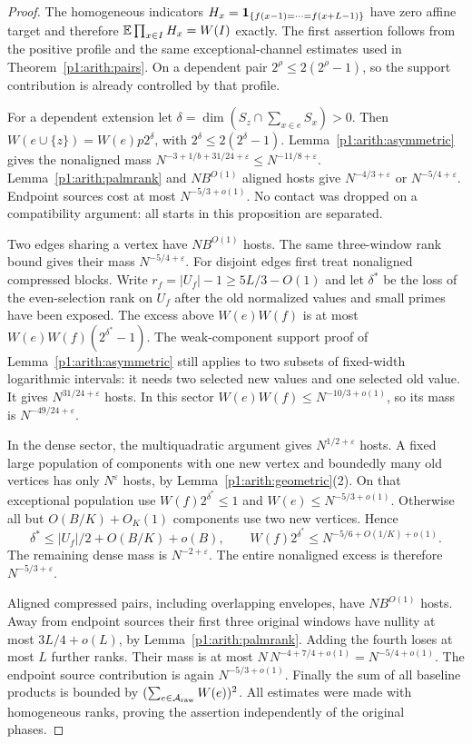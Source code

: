 \begin{proof}
The homogeneous indicators
$H_x=\mathbf 1_{\{f(x-1)=\cdots=f(x+L-1)\}}$ have zero affine target and
therefore $\mathbb E\prod_{x\in I}H_x=W(I)$ exactly.
The first assertion follows from the positive profile and the same
exceptional-channel estimates used in Theorem~\ref{p1:arith:pairs}.
On a dependent pair $2^\rho\leq2(2^\rho-1)$, so the support contribution
is already controlled by that profile.

For a dependent extension let $\delta=\dim(S_z\cap\sum_{x\in e}S_x)>0$.
Then $W(e\cup\{z\})=W(e)p2^\delta$, with
$2^\delta\leq2(2^\delta-1)$.  Lemma~\ref{p1:arith:asymmetric} gives
the nonaligned mass
$N^{-3+1/b+31/24+\varepsilon}\leq N^{-11/8+\varepsilon}$.
Lemma~\ref{p1:arith:palmrank} and $NB^{O(1)}$ aligned hosts give
$N^{-4/3+\varepsilon}$ or $N^{-5/4+\varepsilon}$.
Endpoint sources cost at most $N^{-5/3+o(1)}$.  No contact was dropped
on a compatibility argument: all starts in this proposition are separated.

Two edges sharing a vertex have $NB^{O(1)}$ hosts.  The same three-window
rank bound gives their mass $N^{-5/4+\varepsilon}$.
For disjoint edges first treat nonaligned compressed blocks.  Write
$r_f=|U_f|-1\geq5L/3-O(1)$ and let $\delta^*$ be the loss of the
even-selection rank on $U_f$ after the old normalized values and small
primes have been exposed.  The excess above $W(e)W(f)$ is at most
$W(e)W(f)(2^{\delta^*}-1)$.
The weak-component support proof of Lemma~\ref{p1:arith:asymmetric}
still applies to two subsets of fixed-width logarithmic intervals:
it needs two selected new values and one selected old value.
It gives $N^{31/24+\varepsilon}$ hosts.  In this sector
$W(e)W(f)\leq N^{-10/3+o(1)}$, so its mass is
$N^{-49/24+\varepsilon}$.

In the dense sector, the multiquadratic argument gives
$N^{1/2+\varepsilon}$ hosts.  A fixed large population of components
with one new vertex and boundedly many old vertices has only
$N^\varepsilon$ hosts, by Lemma~\ref{p1:arith:geometric}(2).
On that exceptional population use $W(f)2^{\delta^*}\leq1$ and
$W(e)\leq N^{-5/3+o(1)}$.  Otherwise all but
$O(B/K)+O_K(1)$ components use two new vertices.  Hence
\[
 \delta^*\leq|U_f|/2+O(B/K)+o(B),\qquad
 W(f)2^{\delta^*}\leq N^{-5/6+O(1/K)+o(1)}.
\]
The remaining dense mass is $N^{-2+\varepsilon}$.
The entire nonaligned excess is therefore $N^{-5/3+\varepsilon}$.

Aligned compressed pairs, including overlapping envelopes, have
$NB^{O(1)}$ hosts.  Away from endpoint sources their first three original
windows have nullity at most $3L/4+o(L)$, by
Lemma~\ref{p1:arith:palmrank}.  Adding the fourth loses at most $L$
further ranks.  Their mass is at most
$N\,N^{-4+7/4+o(1)}=N^{-5/4+o(1)}$.
The endpoint source contribution is again $N^{-5/3+o(1)}$.
Finally the sum of all baseline products is bounded by
$(\sum_{e\in\mathcal A_{\rm raw}}W(e))^2$.
All estimates were made with homogeneous ranks, proving the assertion
independently of the original phases.
\end{proof}

